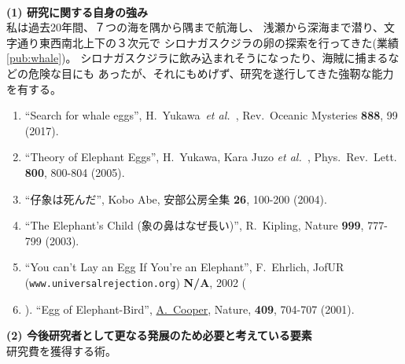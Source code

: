 \documentclass[11pt,a4j,dvipdfmx]{jarticle} 					%
\newcommand{\研究課題名}{象の卵}
\newcommand{\研究機関名}{逢坂大学}
\newcommand{\研究代表者氏名}{湯川秀樹}
\newcommand{\paper}[6]{%
	\item ``#1'', #2, #3 {\bf #4}, #5 (#6).			%
}
\newcommand{\etal}{\textit{et al.\ }}
\newcommand{\yukawa}{H.~Yukawa}					%
\newcommand{\prl}{Phys.\ Rev.\ Lett.\ }		%
\begin{document}
\SelfReviewInstructions\\%
\noindent
\textbf{(1) 研究に関する自身の強み}\\
	私は過去20年間、７つの海を隅から隅まで航海し、
	浅瀬から深海まで潜り、文字通り東西南北上下の３次元で
	シロナガスクジラの卵の探索を行ってきた(業績\ref{pub:whale})。		%
	シロナガスクジラに飲み込まれそうになったり、海賊に捕まるなどの危険な目にも
	あったが、それにもめげず、研究を遂行してきた強靭な能力を有する。
	\begin{enumerate}
		\paper{Search for whale eggs}{\yukawa\ \etal}{Rev.\ Oceanic Mysteries}{888}{99}{2017}
			\label{pub:whale}
				
		\paper{Theory of Elephant Eggs}{\yukawa, Kara Juzo \etal}{\prl}{800}{800-804}{2005}
			\label{pub:theoegg}
				
		\paper{仔象は死んだ}{Kobo Abe}{安部公房全集}{26}{100-200}{2004}
		
		\paper{The Elephant's Child (象の鼻はなぜ長い)}{R.~Kipling}{Nature}{999}{777-799}{2003}

		\paper{You can't Lay an Egg If You're an Elephant}{F.~Ehrlich}
			{JofUR\\({\tt www.universalrejection.org})}{{\bf N/A}}{2002}
		
		\item ``Egg of Elephant-Bird'', 
				\underline{A.~Cooper},
				Nature, {\bf 409}, 704-707 (2001).	%
	\end{enumerate}

\vspace{5mm}
\noindent
\textbf{(2) 今後研究者として更なる発展のため必要と考えている要素}\\
研究費を獲得する術。



\end{document}
